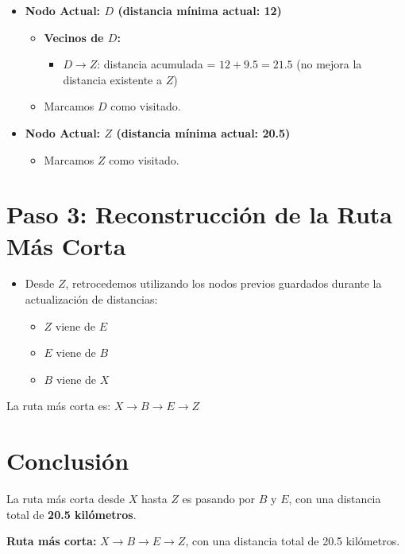 \documentclass{article}
\begin{document}
\begin{itemize}
    \item \textbf{Nodo Actual: \( D \) (distancia mínima actual: 12)}
    \begin{itemize}
        \item \textbf{Vecinos de \( D \):}
        \begin{itemize}
            \item \( D \rightarrow Z \): distancia acumulada = \( 12 + 9.5 = 21.5 \) (no mejora la distancia existente a \( Z \))
        \end{itemize}
        \item Marcamos \( D \) como visitado.
    \end{itemize}

    \item \textbf{Nodo Actual: \( Z \) (distancia mínima actual: 20.5)}
    \begin{itemize}
        \item Marcamos \( Z \) como visitado.
    \end{itemize}
\end{itemize}

\section*{Paso 3: Reconstrucción de la Ruta Más Corta}

\begin{itemize}
    \item Desde \( Z \), retrocedemos utilizando los nodos previos guardados durante la actualización de distancias:
    \begin{itemize}
        \item \( Z \) viene de \( E \)
        \item \( E \) viene de \( B \)
        \item \( B \) viene de \( X \)
    \end{itemize}
\end{itemize}

La ruta más corta es: \( X \rightarrow B \rightarrow E \rightarrow Z \)

\section*{Conclusión}

La ruta más corta desde \( X \) hasta \( Z \) es pasando por \( B \) y \( E \), con una distancia total de \textbf{20.5 kilómetros}.

\textbf{Ruta más corta:} \( X \rightarrow B \rightarrow E \rightarrow Z \), con una distancia total de 20.5 kilómetros.
\end{document}
